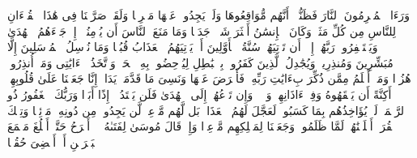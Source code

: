 \stopbuffer
\startbuffer[\q:18:53]
وَرَءَا ٱلۡمُجۡرِمُونَ ٱلنَّارَ فَظَنُّوۤا۟ أَنَّهُم مُّوَاقِعُوهَا وَلَمۡ یَجِدُوا۟ عَنۡهَا مَصۡرِفࣰا%
\stopbuffer
\startbuffer[\q:18:54]
وَلَقَدۡ صَرَّفۡنَا فِی هَٰذَا ٱلۡقُرۡءَانِ لِلنَّاسِ مِن كُلِّ مَثَلࣲۚ وَكَانَ ٱلۡإِنسَٰنُ أَكۡثَرَ شَیۡءࣲ جَدَلࣰا%
\stopbuffer
\startbuffer[\q:18:55]
وَمَا مَنَعَ ٱلنَّاسَ أَن یُؤۡمِنُوۤا۟ إِذۡ جَاۤءَهُمُ ٱلۡهُدَىٰ وَیَسۡتَغۡفِرُوا۟ رَبَّهُمۡ إِلَّاۤ أَن تَأۡتِیَهُمۡ سُنَّةُ ٱلۡأَوَّلِینَ أَوۡ یَأۡتِیَهُمُ ٱلۡعَذَابُ قُبُلࣰا%
\stopbuffer
\startbuffer[\q:18:56]
وَمَا نُرۡسِلُ ٱلۡمُرۡسَلِینَ إِلَّا مُبَشِّرِینَ وَمُنذِرِینَۚ وَیُجَٰدِلُ ٱلَّذِینَ كَفَرُوا۟ بِٱلۡبَٰطِلِ لِیُدۡحِضُوا۟ بِهِ ٱلۡحَقَّۖ وَٱتَّخَذُوۤا۟ ءَایَٰتِی وَمَاۤ أُنذِرُوا۟ هُزُوࣰا%
\stopbuffer
\startbuffer[\q:18:57]
وَمَنۡ أَظۡلَمُ مِمَّن ذُكِّرَ بِءَایَٰتِ رَبِّهِۦ فَأَعۡرَضَ عَنۡهَا وَنَسِیَ مَا قَدَّمَتۡ یَدَاهُۚ إِنَّا جَعَلۡنَا عَلَىٰ قُلُوبِهِمۡ أَكِنَّةً أَن یَفۡقَهُوهُ وَفِیۤ ءَاذَانِهِمۡ وَقۡرࣰاۖ وَإِن تَدۡعُهُمۡ إِلَى ٱلۡهُدَىٰ فَلَن یَهۡتَدُوۤا۟ إِذًا أَبَدࣰا%
\stopbuffer
\startbuffer[\q:18:58]
وَرَبُّكَ ٱلۡغَفُورُ ذُو ٱلرَّحۡمَةِۖ لَوۡ یُؤَاخِذُهُم بِمَا كَسَبُوا۟ لَعَجَّلَ لَهُمُ ٱلۡعَذَابَۚ بَل لَّهُم مَّوۡعِدࣱ لَّن یَجِدُوا۟ مِن دُونِهِۦ مَوۡئِلࣰا%
\stopbuffer
\startbuffer[\q:18:59]
وَتِلۡكَ ٱلۡقُرَىٰۤ أَهۡلَكۡنَٰهُمۡ لَمَّا ظَلَمُوا۟ وَجَعَلۡنَا لِمَهۡلِكِهِم مَّوۡعِدࣰا%
\stopbuffer
\startbuffer[\q:18:60]
وَإِذۡ قَالَ مُوسَىٰ لِفَتَىٰهُ لَاۤ أَبۡرَحُ حَتَّىٰۤ أَبۡلُغَ مَجۡمَعَ ٱلۡبَحۡرَیۡنِ أَوۡ أَمۡضِیَ حُقُبࣰا%
\stopbuffer
